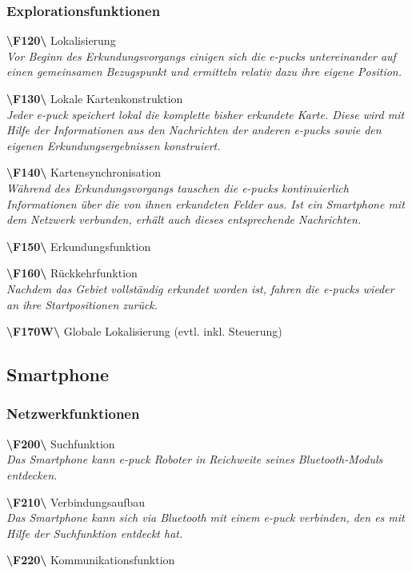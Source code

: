 \documentclass[10pt,a4paper]{article}
\begin{document}
			\subsubsection{Explorationsfunktionen}
				\begin{list}{}{\leftmargin=1cm}
					\item[\textbf{\textbackslash F120\textbackslash}] Lokalisierung
						\\ \textsl{Vor Beginn des Erkundungsvorgangs einigen sich die e-pucks untereinander auf einen gemeinsamen Bezugspunkt
						und ermitteln relativ dazu ihre eigene Position.} 
					\item[\textbf{\textbackslash F130\textbackslash}] Lokale Kartenkonstruktion	
						\\ \textsl{Jeder e-puck speichert lokal die komplette bisher erkundete Karte. Diese wird mit Hilfe
						der Informationen aus den Nachrichten der anderen e-pucks sowie den eigenen Erkundungsergebnissen konstruiert.} 				
					\item[\textbf{\textbackslash F140\textbackslash}] Kartensynchronisation
						\\ \textsl{Während des Erkundungsvorgangs tauschen die e-pucks kontinuierlich Informationen über die von ihnen
						erkundeten Felder aus. Ist ein Smartphone mit dem Netzwerk verbunden, erhält auch dieses entsprechende Nachrichten.} 
					\item[\textbf{\textbackslash F150\textbackslash}] Erkundungsfunktion
					\item[\textbf{\textbackslash F160\textbackslash}] Rückkehrfunktion
						\\ \textsl{Nachdem das Gebiet vollständig erkundet worden ist, fahren die e-pucks wieder an ihre Startpositionen
						zurück.}
					\item[\textbf{\textbackslash F170W\textbackslash}] Globale Lokalisierung (evtl. inkl. Steuerung)
				\end{list}
		\subsection{Smartphone}
			\subsubsection{Netzwerkfunktionen}
				\begin{list}{}{\leftmargin=1cm}
					\item[\textbf{\textbackslash F200\textbackslash}] Suchfunktion
						\\ \textsl{Das Smartphone kann e-puck Roboter in Reichweite seines Bluetooth-Moduls entdecken.}
					\item[\textbf{\textbackslash F210\textbackslash}] Verbindungsaufbau
						\\ \textsl{Das Smartphone kann sich via Bluetooth mit einem e-puck verbinden, den es mit Hilfe
						der Suchfunktion entdeckt hat.}				
					\item[\textbf{\textbackslash F220\textbackslash}] Kommunikationsfunktion
						\\ \textsl{}
				\end{list}				
\end{document}
